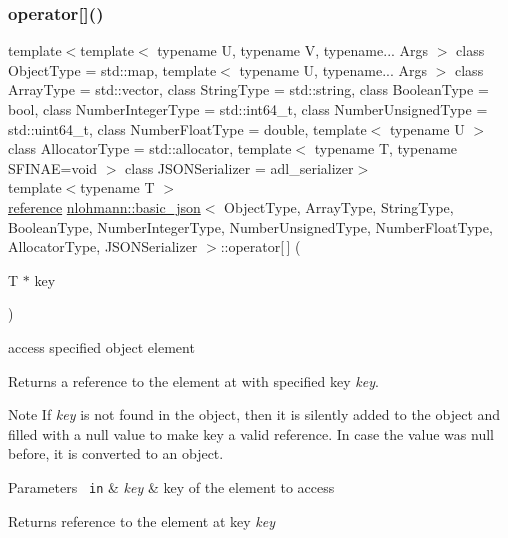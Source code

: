 \subsubsection{\texorpdfstring{operator[]()}{operator[]()}\hspace{0.1cm}{\footnotesize\ttfamily [7/10]}}
{\footnotesize\ttfamily template$<$template$<$ typename U, typename V, typename... Args $>$ class Object\+Type = std\+::map, template$<$ typename U, typename... Args $>$ class Array\+Type = std\+::vector, class String\+Type  = std\+::string, class Boolean\+Type  = bool, class Number\+Integer\+Type  = std\+::int64\+\_\+t, class Number\+Unsigned\+Type  = std\+::uint64\+\_\+t, class Number\+Float\+Type  = double, template$<$ typename U $>$ class Allocator\+Type = std\+::allocator, template$<$ typename T, typename S\+F\+I\+N\+A\+E=void $>$ class J\+S\+O\+N\+Serializer = adl\+\_\+serializer$>$ \\
template$<$typename T $>$ \\
\mbox{\hyperlink{classnlohmann_1_1basic__json_ac6a5eddd156c776ac75ff54cfe54a5bc}{reference}} \mbox{\hyperlink{classnlohmann_1_1basic__json}{nlohmann\+::basic\+\_\+json}}$<$ Object\+Type, Array\+Type, String\+Type, Boolean\+Type, Number\+Integer\+Type, Number\+Unsigned\+Type, Number\+Float\+Type, Allocator\+Type, J\+S\+O\+N\+Serializer $>$\+::operator\mbox{[}$\,$\mbox{]} (\begin{DoxyParamCaption}\item[{T $\ast$}]{key }\end{DoxyParamCaption})\hspace{0.3cm}{\ttfamily [inline]}}



access specified object element 

Returns a reference to the element at with specified key {\itshape key}.

\begin{DoxyNote}{Note}
If {\itshape key} is not found in the object, then it is silently added to the object and filled with a {\ttfamily null} value to make {\ttfamily key} a valid reference. In case the value was {\ttfamily null} before, it is converted to an object.
\end{DoxyNote}

\begin{DoxyParams}[1]{Parameters}
\mbox{\texttt{ in}}  & {\em key} & key of the element to access\\
\hline
\end{DoxyParams}
\begin{DoxyReturn}{Returns}
reference to the element at key {\itshape key} 
\end{DoxyReturn}

